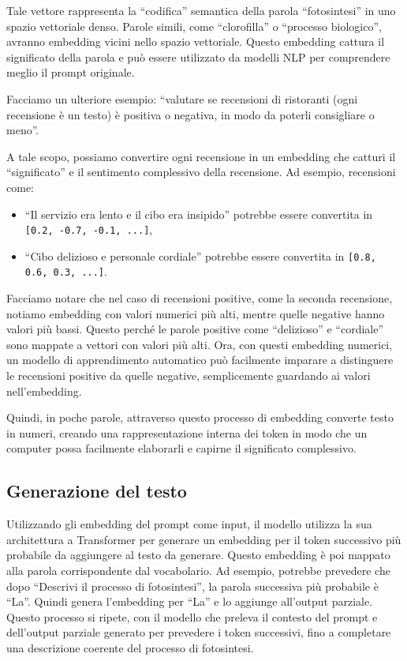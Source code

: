         Tale vettore rappresenta la ``codifica'' semantica della parola ``fotosintesi'' in uno spazio vettoriale denso. Parole simili, come ``clorofilla'' o ``processo biologico'', avranno embedding vicini nello spazio vettoriale. Questo embedding cattura il significato della parola e può essere utilizzato da modelli NLP per comprendere meglio il prompt originale.
        
        Facciamo un ulteriore esempio: “valutare se recensioni di ristoranti (ogni recensione è un testo) è positiva o negativa, in modo da poterli consigliare o meno”.
        
        A tale scopo, possiamo convertire ogni recensione in un embedding che catturi il “significato” e il sentimento complessivo della recensione. Ad esempio, recensioni come:
        \begin{itemize}
            \item ``Il servizio era lento e il cibo era insipido'' potrebbe essere convertita in \texttt{[0.2, -0.7, -0.1, ...]},
            \item ``Cibo delizioso e personale cordiale'' potrebbe essere convertita in	\texttt{[0.8, 0.6, 0.3, ...]}.
        \end{itemize}
        
        Facciamo notare che nel caso di recensioni positive, come la seconda recensione, notiamo embedding con valori numerici più alti, mentre quelle negative hanno valori più bassi. Questo perché le parole positive come ``delizioso'' e ``cordiale'' sono mappate a vettori con valori più alti. Ora, con questi embedding numerici, un modello di apprendimento automatico può facilmente imparare a distinguere le recensioni positive da quelle negative, semplicemente guardando ai valori nell'embedding.
        
        Quindi, in poche parole, attraverso questo processo di embedding converte testo in numeri, creando una rappresentazione interna dei token in modo che un computer possa facilmente elaborarli e capirne il significato complessivo.

    \subsection{Generazione del testo}
        Utilizzando gli embedding del prompt come input, il modello utilizza la sua architettura a Transformer per generare un embedding per il token successivo più probabile da aggiungere al testo da generare. Questo embedding è poi mappato alla parola corrispondente dal vocabolario. Ad esempio, potrebbe prevedere che dopo ``Descrivi il processo di fotosintesi'', la parola successiva più probabile è ``La''. Quindi genera l'embedding per ``La'' e lo aggiunge all'output parziale. Questo processo si ripete, con il modello che preleva il contesto del prompt e dell'output parziale generato per prevedere i token successivi, fino a completare una descrizione coerente del processo di fotosintesi.

